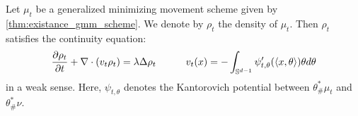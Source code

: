 



\begin{thm}
Let $\mu_t$ be a generalized minimizing movement scheme given by \ref{thm:existance_gmm_scheme}. We denote by $\rho_t$ the density of $\mu_t$. Then $\rho_t$ satisfies the continuity equation:
\begin{align}
\frac{\partial \rho_t}{\partial t} + \nabla \cdot (v_t \rho_t) = \lambda \Delta \rho_t  \quad \quad \quad v_t(x) = - \int_{\mathbb{S}^{d-1}} \psi_{t, \theta}'(\langle x , \theta \rangle ) \theta d\theta  \label{eqn:gradflow_reg}
\end{align}
in a weak sense. Here, $\psi_{t,\theta}$ denotes the Kantorovich potential between $\theta^*_{\#}\mu_t$ and $\theta^*_{\#}\nu$. 
\end{thm}

